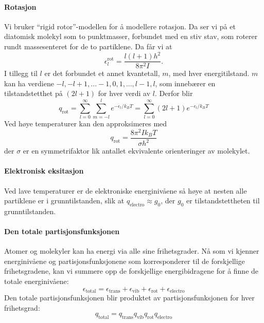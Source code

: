 \paragraph{Rotasjon} Vi bruker ``rigid rotor''-modellen for å modellere rotasjon. Da ser vi på et diatomisk molekyl som to punktmasser, forbundet med en stiv stav, som roterer rundt massesenteret for de to partiklene. Da får vi at
\begin{equation}
	\epsilon_l^{\text{rot}}=\frac{l(l+1)h^2}{8\pi^2I}.
\end{equation}
I tillegg til $l$ er det forbundet et annet kvantetall, $m$, med hver energitilstand. $m$ kan ha verdiene $-l,-l+1,...-1,0,1,...,l-1,l$, som innebærer en tilstandstetthet på $(2l+1)$ for hver verdi av $l$. Derfor blir
\begin{equation}
	q_{\text{rot}} = \sum_{l=0}^\infty\sum_{m=-l}^le^{-\epsilon_l/k_BT}=\sum_{l=0}^\infty(2l+1)e^{-\epsilon_l/k_BT}
\end{equation}
Ved høye temperaturer kan den approksimeres med
\begin{equation}
	q_{\text{rot}} = \frac{8\pi^2Ik_BT}{\sigma h^2}
\end{equation}
der $\sigma$ er en symmetrifaktor lik antallet ekvivalente orienteringer av molekylet. 

\paragraph{Elektronisk eksitasjon} Ved lave temperaturer er de elektroniske energinivåene så høye at nesten alle partiklene er i grunntilstanden, slik at $q_{\text{electro}} \approx g_0$, der $g_0$ er tilstandstettheten til grunntilstanden.

\paragraph{Den totale partisjonsfunksjonen} Atomer og molekyler kan ha energi via alle sine frihetsgrader. Nå som vi kjenner energinivåene og partisjonsfunksjonene som korresponderer til de forskjellige frihetsgradene, kan vi summere opp de forskjellige energibidragene for å finne de totale energinivåene:
\begin{equation}
	\epsilon_{\text{total}} = \epsilon_{\text{trans}}+\epsilon_{\text{vib}}+\epsilon_{\text{rot}}+\epsilon_{\text{electro}}
\end{equation}
Den totale partisjonsfunksjonen blir produktet av partisjonsfunksjonen for hver frihetsgrad:
\begin{equation}
	q_{\text{total}} = q_{\text{trans}}q_{\text{vib}}q_{\text{rot}}q_{\text{electro}}
\end{equation}

